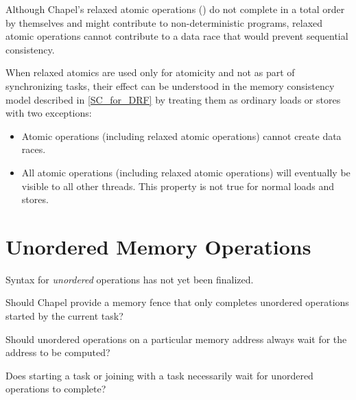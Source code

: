 Although Chapel's relaxed atomic operations
() do not complete in a total order by
themselves and might contribute to non-deterministic programs, relaxed
atomic operations cannot contribute to a data race that would prevent
sequential consistency.

When relaxed atomics are used only for atomicity and not as part of
synchronizing tasks, their effect can be understood in the memory
consistency model described in \ref{SC_for_DRF} by treating them as
ordinary loads or stores with two exceptions:

\begin{itemize}

\item Atomic operations (including relaxed atomic operations) cannot
create data races.

\item All atomic operations (including relaxed atomic operations) will
eventually be visible to all other threads. This property is not true for
normal loads and stores.

\end{itemize}

\section{Unordered Memory Operations}
\label{unordered_operations}

\begin{openissue}
Syntax for \textit{unordered} operations has not yet been finalized.
\end{openissue}

\begin{openissue}
Should Chapel provide a memory fence that only completes unordered
operations started by the current task?
\end{openissue}
\begin{openissue}
Should unordered operations on a particular memory address always wait
for the address to be computed?
\end{openissue}
\begin{openissue}
Does starting a task or joining with a task necessarily wait for
unordered operations to complete?
\end{openissue}

